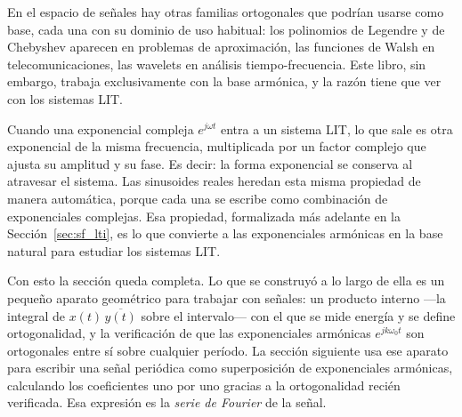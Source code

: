 \documentclass[class=book, crop=false]{standalone}
\begin{document}
\begin{nota}
En el espacio de señales hay otras familias ortogonales que podrían
usarse como base, cada una con su dominio de uso habitual: los
polinomios de Legendre y de Chebyshev aparecen en problemas de
aproximación, las funciones de Walsh en telecomunicaciones, las
wavelets en análisis tiempo-frecuencia. Este libro, sin embargo,
trabaja exclusivamente con la base armónica, y la razón tiene que ver
con los sistemas LIT.

Cuando una exponencial compleja $e^{j\omega t}$ entra a un sistema
LIT, lo que sale es otra exponencial de la misma frecuencia,
multiplicada por un factor complejo que ajusta su amplitud y su fase.
Es decir: la forma exponencial se conserva al atravesar el sistema.
Las sinusoides reales heredan esta misma propiedad de manera
automática, porque cada una se escribe como combinación de
exponenciales complejas. Esa propiedad, formalizada más adelante en
la Sección~\ref{sec:sf_lti}, es lo que convierte a las exponenciales
armónicas en la base natural para estudiar los sistemas LIT.
\end{nota}

Con esto la sección queda completa. Lo que se construyó a lo largo de
ella es un pequeño aparato geométrico para trabajar con señales: un
producto interno —la integral de $x(t)\,\overline{y(t)}$ sobre el
intervalo— con el que se mide energía y se define ortogonalidad, y la
verificación de que las exponenciales armónicas $e^{jk\omega_0 t}$ son
ortogonales entre sí sobre cualquier período. La sección siguiente usa
ese aparato para escribir una señal periódica como superposición de
exponenciales armónicas, calculando los coeficientes uno por uno
gracias a la ortogonalidad recién verificada. Esa expresión es la
\emph{serie de Fourier} de la señal.
\end{document}

